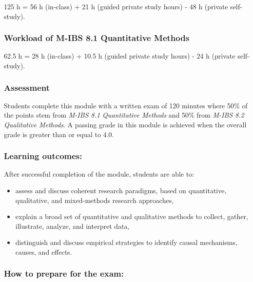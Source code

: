 \documentclass[
  12pt,
  oneside]{book}
\providecommand{\tightlist}{%
  \setlength{\itemsep}{0pt}\setlength{\parskip}{0pt}}
\theoremstyle{definition}
\theoremstyle{definition}
\theoremstyle{definition}
\theoremstyle{definition}
\theoremstyle{remark}
\begin{document}
125 h = 56 h (in-class) + 21 h (guided private study hours) - 48 h (private self-study).

\hypertarget{workload-of-m-ibs-8.1-quantitative-methods}{%
\subsubsection*{Workload of M-IBS 8.1 Quantitative Methods}\label{workload-of-m-ibs-8.1-quantitative-methods}}

62.5 h = 28 h (in-class) + 10.5 h (guided private study hours) - 24 h (private self-study).

\hypertarget{assessment}{%
\subsubsection*{Assessment}\label{assessment}}

Students complete this module with a written exam of 120 minutes where 50\% of the points stem from \emph{M-IBS 8.1 Quantitative Methods} and 50\% from \emph{M-IBS 8.2 Qualitative Methods}. A passing grade in this module is achieved when the overall grade is greater than or equal to 4.0.

\hypertarget{learning-outcomes}{%
\subsubsection*{Learning outcomes:}\label{learning-outcomes}}

After successful completion of the module, students are able to:

\begin{itemize}
\tightlist
\item
  assess and discuss coherent research paradigms, based on quantitative, qualitative, and mixed-methods research approaches,
\item
  explain a broad set of quantitative and qualitative methods to collect, gather, illustrate, analyze, and interpret data,
\item
  distinguish and discuss empirical strategies to identify causal mechanisms, causes, and effects.
\end{itemize}

\hypertarget{how-to-prepare-for-the-exam}{%
\subsubsection*{How to prepare for the exam:}\label{how-to-prepare-for-the-exam}}
\end{document}
